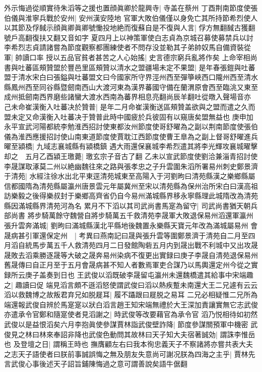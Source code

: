 外示悔過從順實待朱滔等之援也置顔眞卿於龍興寺|{
	寺盖在蔡州}
丁酉荆南節度使張伯儀與淮寧兵戰於安州|{
	安州漢安陸地}
官軍大敗伯儀僅以身免亡其所持節希烈使人以其節及俘馘示顔眞卿眞卿號慟投地絶而復蘇自是不復與人言|{
	俘方無翻馘古獲翻號戶高翻復扶又翻又音如字}
夏四月上以神策軍使白志貞為京城召募使募禁兵以討李希烈志貞請諸嘗為節度觀察都團練使者不問存没並勒其子弟帥奴馬自備資裝從軍|{
	帥讀口率}
授以五品官貧者甚苦之人心始搖|{
	史言德宗窮兵亂將作矣}
上命宰相尚書與吐蕃區頰贊盟於豐邑里區頰贊以清水之盟疆場未定不果盟|{
	是年春張鎧與吐蕃盟于清水宋白曰張鎰與吐蕃盟文曰今國家所守界涇州西至彈箏峽西口隴州西至清水縣鳳州西至同谷縣暨劒南西山大渡河東為漢界蕃國守備在蘭渭原會西至臨洮又東至成州抵劒南西界磨些諸蠻大渡水西南為蕃界相息亮翻尚辰羊翻吐從暾入聲場音亦}
己未命崔漢衡入吐蕃决於贊普|{
	是年二月命崔漢衡送區頰贊盖欲與之盟而遣之久而盟未定又命漢衡入吐蕃决于贊普此時中國疲於兵彼固有以窺唐矣盟無益也}
庚申加永平宣武河陽都統李勉淮西招討使東都汝州節度使哥舒曜為之副以荆南節度使張伯儀為淮西應援招討使山南東道節度使賈耽江西節度使曹王臯為之副上督哥舒曜進兵曜至潁橋|{
	九域志襄城縣有潁橋鎮}
遇大雨還保襄城李希烈遣其將李光輝攻襄城曜擊却之　五月乙酉潁王璬薨|{
	璬玄宗子音古了翻}
乙未以宣武節度使劉洽兼淄青招討使　李晟謀取涿莫二州以絶幽魏往來之路與張孝忠之子升雲圍朱滔所署易州刺史鄭景濟于清苑|{
	水經注徐水出北平東逕清苑城東至高陽入于河劉昫曰清苑縣漢之樂鄉縣屬信都國隋為清苑縣屬瀛州唐景雲元年屬冀州至宋以清苑縣為保州治所宋白曰漢高祖訪樂毅之後得樂叔封于樂鄉高齊省仍自今易州滿城縣界移永寧縣理此城隋改為清苑縣因滿城縣界清苑河為名}
累月不下滔以其司武尚書馬寔為留守|{
	司武尚書猶天朝兵部尚書}
將步騎萬餘守魏營自將步騎萬五千救清苑李晟軍大敗退保易州滔還軍瀛州張升雲奔滿城|{
	劉昫曰滿城縣漢北平縣地後魏置永樂縣天寶元年改為滿城屬易州}
會晟病甚引軍還保定州　|{
	考異曰燕南記曰晟與張升雲等圍鄭景濟于清苑自二月至四月滔自統馬步萬五千人救清苑四月二日發館陶砦五月内到晟出戰不利城中又出攻晟晟敗去滔乘勝逐晟等大破之晟奔易州染病不復更出實録曰庚子李晟自清苑退保易州舊晟傳曰自正月至于五月會晟病甚不知人者數焉軍吏合謀乃以馬輿還定州今從之實録所云庚子盖奏到日也}
王武俊以滔既破李晟留屯瀛州未還魏橋遣其給事中宋端趣之|{
	趣讀曰促}
端見滔言頗不遜滔怒使謂武俊曰滔以熱疾蹔未南還大王二兄遽有云云滔以救魏博之故叛君弃兄如脱屣耳|{
	履不躡跟曰屣脱之易耳}
二兄必相疑惟二兄所為端還報武俊自辨於馬寔寔以狀白滔言趙王知宋端無禮於大王深加責讓實無它志武俊亦遣承令官鄭和隨寔使者見滔謝之|{
	時武俊等改要藉官為承令官}
滔乃悦相待如初然武俊以是益恨滔矣六月李抱眞使參謀賈林詣武俊壁詐降|{
	節度參謀關預軍中機密}
武俊見之林曰林來奉詔非降也武俊色動問其故林曰天子知大夫宿著誠効|{
	謂誅李惟岳也}
及登壇之日|{
	謂稱王時也}
撫膺顧左右曰我本徇忠義天子不察諸將亦嘗共表大夫之志天子語使者曰朕前事誠誤悔之無及朋友失意尚可謝况朕為四海之主乎|{
	賈林先言武俊心事後述天子詔旨鋪陳悔過之意可謂善說矣語牛倨翻}
